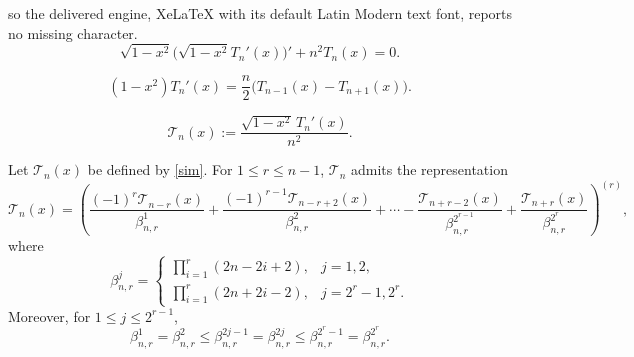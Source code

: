 \documentclass[10pt,a4paper]{amsart}
\begin{document}
so the delivered engine, XeLaTeX with its default Latin Modern text font, reports no missing character.
\begin{equation}\label{Str}
\sqrt{1-x^2}\bigl(\sqrt{1-x^2}T_n'(x)\bigr)'+n^2T_n(x)=0.
\end{equation}

\begin{equation}\label{eqb}
(1-x^2)T_n'(x)=\frac{n}{2}\bigl(T_{n-1}(x)-T_{n+1}(x)\bigr).
\end{equation}

\begin{equation}\label{sim}
\mathcal{T}_n(x):=\frac{\sqrt{1-x^2}\,T_n'(x)}{n^2}.
\end{equation}

\begin{lemma}\label{key}
    Let $\mathcal{T}_n(x)$ be defined by \eqref{sim}. For $1\le r\le n-1$, $\mathcal{T}_n$
    admits the representation
    \[
    \mathcal{T}_n(x)=\left(
    \frac{(-1)^r\mathcal{T}_{n-r}(x)}{\beta^1_{n,r}}
    +\frac{(-1)^{r-1}\mathcal{T}_{n-r+2}(x)}{\beta^2_{n,r}}
    +\cdots
    -\frac{\mathcal{T}_{n+r-2}(x)}{\beta^{2^{r-1}}_{n,r}}
    +\frac{\mathcal{T}_{n+r}(x)}{\beta^{2^{r}}_{n,r}}
    \right)^{(r)},
    \]
    where
    \[
    \beta^j_{n,r}=
    \begin{cases}
    \displaystyle\prod_{i=1}^{r}(2n-2i+2), & j=1,2,\\[4pt]
    \displaystyle\prod_{i=1}^{r}(2n+2i-2), & j=2^{r}-1,2^r.
    \end{cases}
    \]
    Moreover, for $1\le j\le 2^{r-1}$,
    \[
    \beta^1_{n,r}=\beta^2_{n,r}
    \le \beta^{2j-1}_{n,r}=\beta^{2j}_{n,r}
    \le \beta^{2^{r}-1}_{n,r}=\beta^{2^{r}}_{n,r}.
    \]
\end{lemma}
\end{document}
